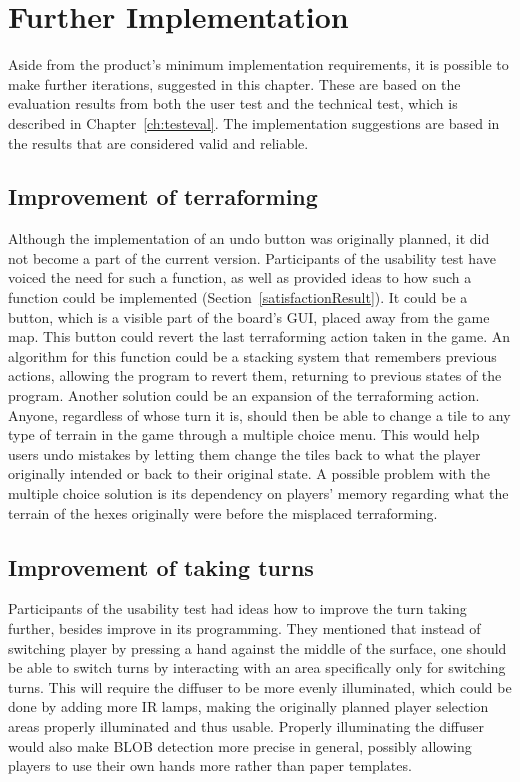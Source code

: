 \section{Further Implementation}
Aside from the product's minimum implementation requirements, it is possible to make further iterations, suggested in this chapter. These are based on the evaluation results from both the user test and the technical test, which is described in Chapter~\ref{ch:testeval}. The implementation suggestions are based in the results that are considered valid and reliable.

\subsection{Improvement of terraforming}
Although the implementation of an undo button was originally planned, it did not become a part of the current version. Participants of the usability test have voiced the need for such a function, as well as provided ideas to how such a function could be implemented (Section~\ref{satisfactionResult}). It could be a button, which is a visible part of the board's GUI, placed away from the game map. This button could revert the last terraforming action taken in the game. An algorithm for this function could be a stacking system that remembers previous actions, allowing the program to revert them, returning to previous states of the program. Another solution could be an expansion of the terraforming action. Anyone, regardless of whose turn it is, should then be able to change a tile to any type of terrain in the game through a multiple choice menu. This would help users undo mistakes by letting them change the tiles back to what the player originally intended or back to their original state. A possible problem with the multiple choice solution is its dependency on players' memory regarding what the terrain of the hexes originally were before the misplaced terraforming. 

\subsection{Improvement of taking turns}
Participants of the usability test had ideas how to improve the turn taking further, besides improve in its programming. They mentioned that instead of switching player by pressing a hand against the middle of the surface, one should be able to switch turns by interacting with an area specifically only for switching turns. This will require the diffuser to be more evenly illuminated, which could be done by adding more IR lamps, making the originally planned player selection areas properly illuminated and thus usable. Properly illuminating the diffuser would also make BLOB detection more precise in general, possibly allowing players to use their own hands more rather than paper templates.

